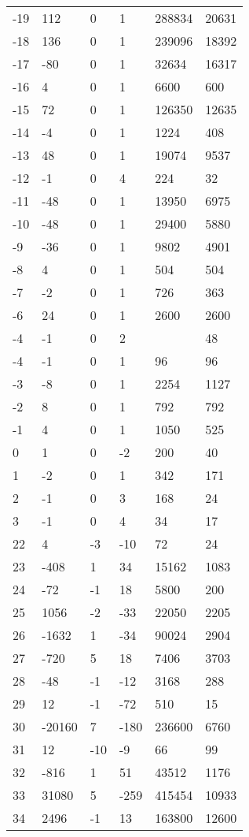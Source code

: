 \documentclass{amsart}
\begin{document}
\begin{longtable}{llllll}
-19 & 112 & 0 & 1 & 288834 & 20631\\
-18 & 136 & 0 & 1 & 239096 & 18392\\
-17 & -80 & 0 & 1 & 32634 & 16317\\
-16 & 4 & 0 & 1 & 6600 & 600\\
-15 & 72 & 0 & 1 & 126350 & 12635\\
-14 & -4 & 0 & 1 & 1224 & 408\\
-13 & 48 & 0 & 1 & 19074 & 9537\\
-12 & -1 & 0 & 4 & 224 & 32\\
-11 & -48 & 0 & 1 & 13950 & 6975\\
-10 & -48 & 0 & 1 & 29400 & 5880\\
-9 & -36 & 0 & 1 & 9802 & 4901\\
-8 & 4 & 0 & 1 & 504 & 504\\
-7 & -2 & 0 & 1 & 726 & 363\\
-6 & 24 & 0 & 1 & 2600 & 2600\\
-4 & -1 & 0 & 2 &  & 48\\
-4 & -1 & 0 & 1 & 96 & 96\\
-3 & -8 & 0 & 1 & 2254 & 1127\\
-2 & 8 & 0 & 1 & 792 & 792\\
-1 & 4 & 0 & 1 & 1050 & 525\\
0 & 1 & 0 & -2 & 200 & 40\\
1 & -2 & 0 & 1 & 342 & 171\\
2 & -1 & 0 & 3 & 168 & 24\\
3 & -1 & 0 & 4 & 34 & 17\\
22 & 4 & -3 & -10 & 72 & 24\\
23 & -408 & 1 & 34 & 15162 & 1083\\
24 & -72 & -1 & 18 & 5800 & 200\\
25 & 1056 & -2 & -33 & 22050 & 2205\\
26 & -1632 & 1 & -34 & 90024 & 2904\\
27 & -720 & 5 & 18 & 7406 & 3703\\
28 & -48 & -1 & -12 & 3168 & 288\\
29 & 12 & -1 & -72 & 510 & 15\\
30 & -20160 & 7 & -180 & 236600 & 6760\\
31 & 12 & -10 & -9 & 66 & 99\\
32 & -816 & 1 & 51 & 43512 & 1176\\
33 & 31080 & 5 & -259 & 415454 & 10933\\
34 & 2496 & -1 & 13 & 163800 & 12600\\

\end{longtable}
\end{document}
